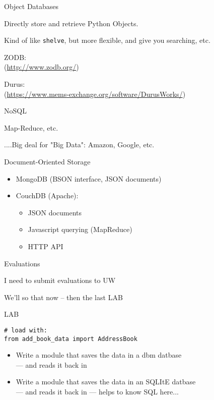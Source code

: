 \documentclass{beamer}
\begin{document}
\begin{frame}[fragile]{Object Databases}

{\Large Directly store and retrieve Python Objects.}

\vfill
{\Large Kind of like \verb|shelve|, but more flexible, and give you searching, etc.}

\vfill
{\Large ZODB:}\\
(\url{http://www.zodb.org/})

\vfill
{\Large Durus:}\\
(\url{https://www.mems-exchange.org/software/DurusWorks/})

\end{frame} 

\begin{frame}[fragile]{NoSQL}

{\Large Map-Reduce, etc.}

\vfill
{\Large....Big deal for "Big Data": Amazon, Google, etc.}

\vfill
{\Large Document-Oriented Storage}
 
{\large
\begin{itemize}
  \item MongoDB (BSON interface, JSON documents)
  \item CouchDB (Apache):
  \begin{itemize}
    \item  JSON documents
    \item  Javascript querying (MapReduce)  
    \item  HTTP API  
  \end{itemize}
\end{itemize}
}

\end{frame} 

\begin{frame}{Evaluations}

{\LARGE I need to submit evaluations to UW}

\vfill
{\LARGE We'll so that now -- then the last LAB}

\end{frame}


\begin{frame}[fragile]{LAB}

\begin{verbatim}
# load with:
from add_book_data import AddressBook
\end{verbatim}

\begin{itemize}
  \item Write a module that saves the data in a dbm datbase\\
        --- and reads it back in
  \item Write a module that saves the data in an SQLItE datbase\\
        --- and reads it back in
        --- helps to know SQL here...
\end{itemize}

\end{frame}
\end{document}
